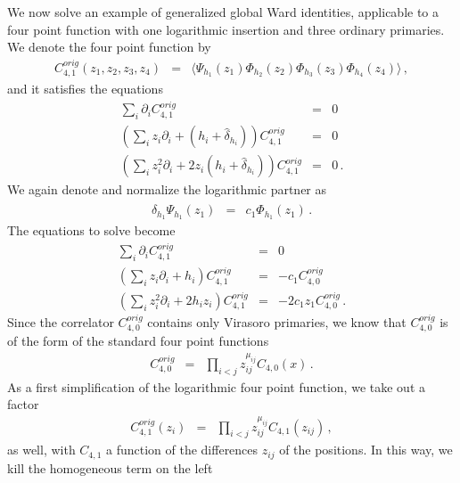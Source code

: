 \documentclass[12pt]{article}
\numberwithin{equation}{section}
\numberwithin{equation}{section}
\numberwithin{table}{section}\setlength{\multlinegap}{25pt}
\begin{document}
We now solve an example of generalized global Ward identities, applicable to a four point function with one logarithmic
insertion and three ordinary
 primaries. We denote the four point function by
\begin{eqnarray}
C^{orig}_{4,1}(z_1,z_2,z_3,z_4) &=&  \langle \Psi_{h_1}(z_1) \Phi_{h_2}(z_2)\Phi_{h_3}(z_3)\Phi_{h_4}(z_4) \rangle \, ,
\end{eqnarray}
and it satisfies the equations
\begin{eqnarray}
\sum_i \partial_i C_{4,1}^{orig} &=& 0
\nonumber \\
(\sum_i z_i \partial_i + (h_i + \hat{\delta}_{h_i})) C_{4,1}^{orig} &=& 0
\nonumber \\
(\sum_i z_i^2 \partial_i + 2 z_i (h_i + \hat{\delta}_{h_i})) C_{4,1}^{orig} &=& 0 \, .
\end{eqnarray}
We again denote and normalize the logarithmic
partner as
\begin{eqnarray}
\hat{\delta}_{h_1} \Psi_{h_1}(z_1) &=& c_1 \Phi_{h_1} (z_1)
\, .
\end{eqnarray}
The equations to solve become
\begin{eqnarray}
\sum_i \partial_i C_{4,1}^{orig} &=& 0
\nonumber \\
(\sum_i z_i \partial_i + h_i ) C_{4,1}^{orig} &=& -c_1 C_{4,0}^{orig}
\nonumber \\
(\sum_i z_i^2 \partial_i + 2 h_i z_i) C_{4,1}^{orig} &=& -2 c_1 z_1 C_{4,0}^{orig}  \, .
\end{eqnarray}
Since the correlator $C_{4,0}^{orig}$ contains only Virasoro primaries, we know that $C_{4,0}^{orig}$ is of the form of the standard four point functions
\begin{eqnarray}
C_{4,0}^{orig} &=& \prod_{i<j} z_{ij}^{\mu_{ij}} 
C_{4,0}(x) \,.
\end{eqnarray}
As a first simplification of the logarithmic four point function, we take out a factor 
\begin{eqnarray}
C_{4,1}^{orig} (z_i) &=& \prod_{i<j} z_{ij}^{\mu_{ij}} 
C_{4,1}(z_{ij}) \, ,
\end{eqnarray}
as well, with $C_{4,1}$ a function of the differences $z_{ij}$ of the positions. In this way, we kill the homogeneous term on the left
\end{document}
